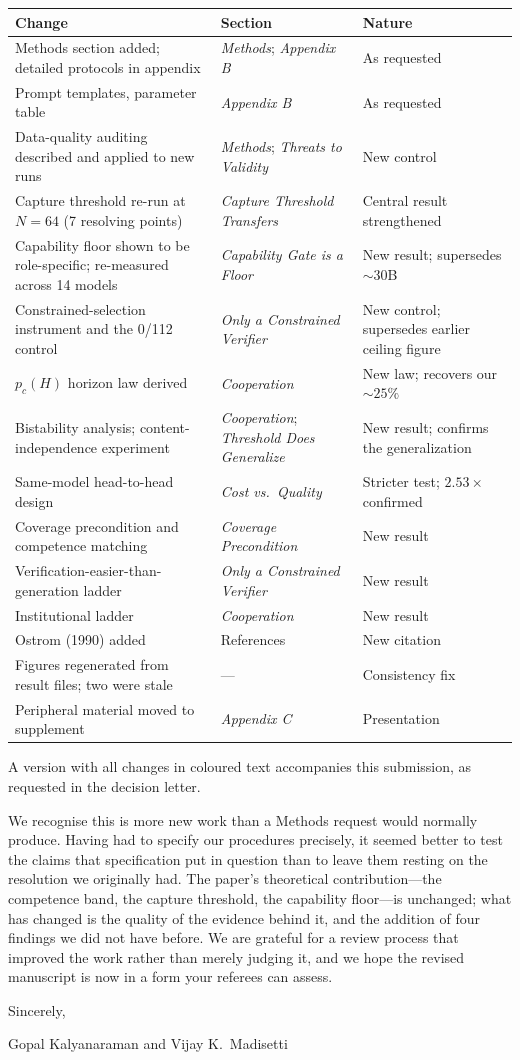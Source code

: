 \documentclass[11pt,a4paper]{article}
\begin{document}
\begin{longtable}{@{}p{7.4cm}p{4.2cm}p{3.4cm}@{}}
\toprule
\textbf{Change} & \textbf{Section} & \textbf{Nature} \\
\midrule
\endhead
Methods section added; detailed protocols in appendix & \emph{Methods}; \emph{Appendix B} & As requested \\
Prompt templates, parameter table & \emph{Appendix B} & As requested \\
Data-quality auditing described and applied to new runs & \emph{Methods}; \emph{Threats to Validity} & New control \\
Capture threshold re-run at $N=64$ (7 resolving points) & \emph{Capture Threshold Transfers} & Central result strengthened \\
Capability floor shown to be role-specific; re-measured across 14 models & \emph{Capability Gate is a Floor} & New result; supersedes ${\sim}30$B \\
Constrained-selection instrument and the 0/112 control & \emph{Only a Constrained Verifier} & New control; supersedes earlier ceiling figure \\
$p_c(H)$ horizon law derived & \emph{Cooperation} & New law; recovers our ${\sim}25\%$ \\
Bistability analysis; content-independence experiment & \emph{Cooperation}; \emph{Threshold Does Generalize} & New result; confirms the generalization \\
Same-model head-to-head design & \emph{Cost vs.\ Quality} & Stricter test; $2.53\times$ confirmed \\
Coverage precondition and competence matching & \emph{Coverage Precondition} & New result \\
Verification-easier-than-generation ladder & \emph{Only a Constrained Verifier} & New result \\
Institutional ladder & \emph{Cooperation} & New result \\
Ostrom (1990) added & References & New citation \\
Figures regenerated from result files; two were stale & --- & Consistency fix \\
Peripheral material moved to supplement & \emph{Appendix C} & Presentation \\
\bottomrule
\end{longtable}

A version with all changes in coloured text accompanies this submission, as
requested in the decision letter.

We recognise this is more new work than a Methods request would normally produce.
Having had to specify our procedures precisely, it seemed better to test the claims
that specification put in question than to leave them resting on the resolution we
originally had. The paper's theoretical contribution---the competence band, the
capture threshold, the capability floor---is unchanged; what has changed is the
quality of the evidence behind it, and the addition of four findings we did not have
before. We are grateful for a review process that improved the work rather than
merely judging it, and we hope the revised manuscript is now in a form your referees
can assess.

\bigskip
Sincerely,

\medskip
Gopal Kalyanaraman and Vijay K.\ Madisetti
\end{document}
